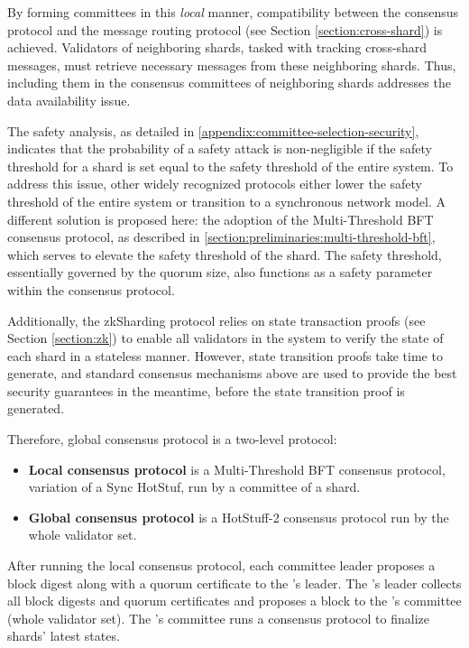 \begin{remark}
By forming committees in this \emph{local} manner, 
 compatibility between the consensus protocol and the message routing protocol (see Section \ref{section:cross-shard}) is achieved. 
Validators of neighboring shards, tasked with tracking cross-shard messages,
 must retrieve necessary messages from these neighboring shards.
Thus, including them in the consensus committees of neighboring shards addresses the data availability issue.
\end{remark}

The safety analysis, as detailed in \ref{appendix:committee-selection-security}, 
 indicates that the probability of a safety attack is non-negligible if the safety threshold for a shard 
 is set equal to the safety threshold of the entire system.
To address this issue, other widely recognized protocols \cite{OmniLedger,RapidChain} 
 either lower the safety threshold of the entire system or transition to a synchronous network model.
A different solution is proposed here: the adoption of the Multi-Threshold BFT \cite{MultiThresholdBFT} consensus protocol, 
 as described in \ref{section:preliminaries:multi-threshold-bft}, 
 which serves to elevate the safety threshold of the shard. 
The safety threshold, essentially governed by the quorum size, 
 also functions as a safety parameter within the consensus protocol.

Additionally, the zkSharding protocol relies on state transaction proofs (see Section \ref{section:zk}) 
 to enable all validators in the system to verify the state of each shard in a stateless manner. 
However, state transition proofs take time to generate, 
 and standard consensus mechanisms above are used to provide the best security guarantees in the meantime, 
 before the state transition proof is generated.

Therefore, global consensus protocol is a two-level protocol:
\begin{itemize}
    \item \textbf{Local consensus protocol} is a Multi-Threshold BFT consensus protocol, variation of a Sync HotStuf, run by a committee of a shard.
    \item \textbf{Global consensus protocol} is a HotStuff-2 consensus protocol run by the whole validator set.
\end{itemize}

After running the local consensus protocol, each committee leader proposes a block digest along with a quorum certificate to the \mainshard's leader.
The \mainshard's leader collects all block digests and quorum certificates and proposes a block to the \mainshard's committee (whole validator set).
The \mainshard's committee runs a consensus protocol to finalize shards' latest states.


